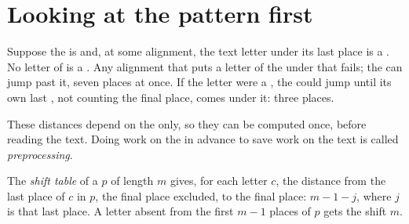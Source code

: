 \label{out:g12:text-search:worst}

\section{Looking at the pattern first}\label{sec:g12:text-search:preprocessing}

Suppose the  is  and, at some alignment, the text letter under its last place is a . No
letter of  is a . Any alignment that puts a letter of the  under that  fails; the
 can jump past it, seven places at once. If the letter were a , the  could jump until its own
last , not counting the final place, comes under it: three places.

These distances depend on the  only, so they can be computed once, before reading the text. Doing work on
the  in advance to save work on the text is called \emph{preprocessing}.

\begin{definition}\label{def:g12:text-search:shift-table}
The \emph{shift table} of a  $p$ of length $m$ gives, for each letter $c$, the distance from
the last place of $c$ in $p$, the final place excluded, to the final place: $m - 1 - j$, where $j$ is that last place.
A letter absent from the first $m - 1$ places of $p$ gets the shift $m$.
\end{definition}

\label{lst:g12:text-search:shift}

\label{out:g12:text-search:shift}

